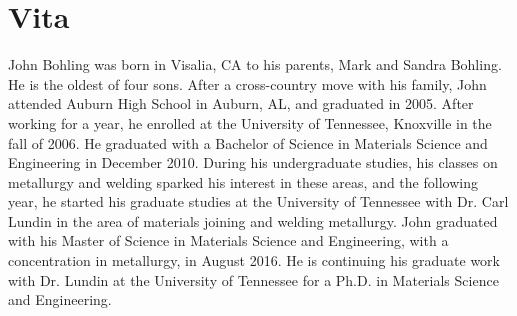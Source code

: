 \chapter*{Vita} \label{ch:vita}
John Bohling was born in Visalia, CA to his parents, Mark and Sandra Bohling. He is the oldest of four sons. After a cross-country move with his family, John attended Auburn High School in Auburn, AL, and graduated in 2005. After working for a year, he enrolled at the University of Tennessee, Knoxville in the fall of 2006. He graduated with a Bachelor of Science in Materials Science and Engineering in December 2010. During his undergraduate studies, his classes on metallurgy and welding sparked his interest in these areas, and the following year, he started his graduate studies at the University of Tennessee with Dr. Carl Lundin in the area of materials joining and welding metallurgy. John graduated with his Master of Science in Materials Science and Engineering, with a concentration in metallurgy, in August 2016. He is continuing his graduate work with Dr. Lundin at the University of Tennessee for a Ph.D. in Materials Science and Engineering.